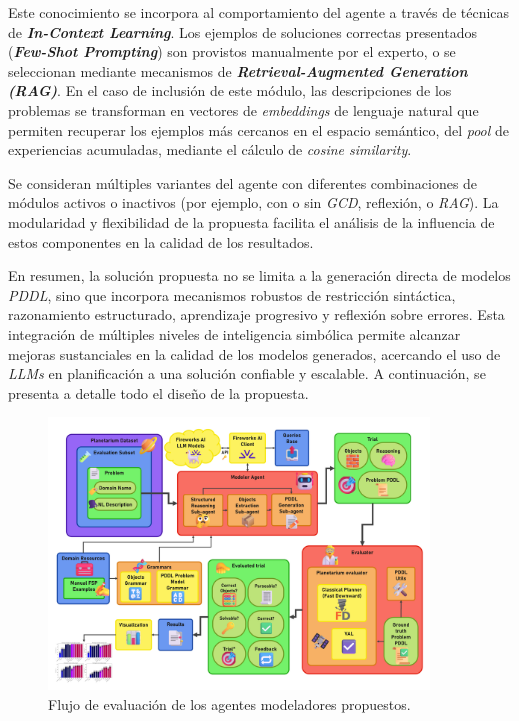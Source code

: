 Este conocimiento se incorpora al comportamiento del agente a través de técnicas de \textbf{\textit{In-Context Learning}}. Los ejemplos de soluciones correctas presentados (\textbf{\textit{Few-Shot Prompting}}) son provistos manualmente por el experto, o se seleccionan mediante mecanismos de \textbf{\textit{Retrieval-Augmented Generation (RAG)}}. En el caso de inclusión de este módulo, las descripciones de los problemas se transforman en vectores de \textit{embeddings} de lenguaje natural que permiten recuperar los ejemplos más cercanos en el espacio semántico, del \textit{pool} de experiencias acumuladas, mediante el cálculo de \textit{cosine similarity}.

Se consideran múltiples variantes del agente con diferentes combinaciones de módulos activos o inactivos (por ejemplo, con o sin \textit{GCD}, reflexión, o \textit{RAG}). La modularidad y flexibilidad de la propuesta facilita el análisis de la influencia de estos componentes en la calidad de los resultados.

En resumen, la solución propuesta no se limita a la generación directa de modelos \textit{PDDL}, sino que incorpora mecanismos robustos de restricción sintáctica, razonamiento estructurado, aprendizaje progresivo y reflexión sobre errores. Esta integración de múltiples niveles de inteligencia simbólica permite alcanzar mejoras sustanciales en la calidad de los modelos generados, acercando el uso de \textit{LLMs} en planificación a una solución confiable y escalable. A continuación, se presenta a detalle todo el diseño de la propuesta.

\begin{figure}[H]
\centering
\includegraphics[width=0.9\textwidth]{Graphics/evaluation.png}
\caption{Flujo de evaluación de los agentes modeladores propuestos.}
\label{fig:objects}
\end{figure}

